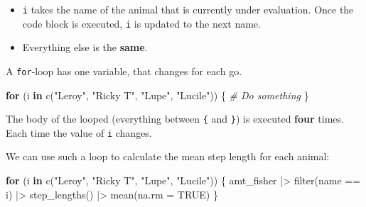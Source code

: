 \documentclass[ignorenonframetext,,t]{beamer}
\let\oldtextbf\textbf
\renewcommand{\textbf}[1]{\textcolor{spamwell}{\oldtextbf{#1}}}
\providecommand{\tightlist}{%
\setlength{\itemsep}{0pt}\setlength{\parskip}{0pt}}
\newenvironment{Shaded}{\begin{snugshade}}{\end{snugshade}}
\newcommand{\AttributeTok}[1]{\textcolor[rgb]{0.77,0.63,0.00}{#1}}
\newcommand{\CommentTok}[1]{\textcolor[rgb]{0.56,0.35,0.01}{\textit{#1}}}
\newcommand{\ConstantTok}[1]{\textcolor[rgb]{0.00,0.00,0.00}{#1}}
\newcommand{\ControlFlowTok}[1]{\textcolor[rgb]{0.13,0.29,0.53}{\textbf{#1}}}
\newcommand{\FunctionTok}[1]{\textcolor[rgb]{0.00,0.00,0.00}{#1}}
\newcommand{\NormalTok}[1]{#1}
\newcommand{\SpecialCharTok}[1]{\textcolor[rgb]{0.00,0.00,0.00}{#1}}
\newcommand{\StringTok}[1]{\textcolor[rgb]{0.31,0.60,0.02}{#1}}
\providecommand{\tightlist}{%
\setlength{\itemsep}{0pt}\setlength{\parskip}{0pt}}
\renewcommand{\tightlist}{\setlength{\itemsep}{1.4ex}\setlength{\parskip}{0pt}}
\begin{document}
\begin{frame}[fragile]
\begin{itemize}
\tightlist
\item
  \texttt{i} takes the name of the animal that is currently under
  evaluation. Once the code block is executed, \texttt{i} is updated to
  the next name.
\item
  Everything else is the \textbf{same}.
\end{itemize}

A \texttt{for}-loop has one variable, that changes for each go.

\begin{Shaded}
\begin{Highlighting}[]
\ControlFlowTok{for}\NormalTok{ (i }\ControlFlowTok{in} \FunctionTok{c}\NormalTok{(}\StringTok{"Leroy"}\NormalTok{, }\StringTok{"Ricky T"}\NormalTok{, }\StringTok{"Lupe"}\NormalTok{, }\StringTok{"Lucile"}\NormalTok{)) \{}
  \CommentTok{\# Do something}
\NormalTok{\}}
\end{Highlighting}
\end{Shaded}

The body of the looped (everything between \texttt{\{} and \texttt{\}})
is executed \textbf{four} times. Each time the value of \texttt{i}
changes.
\end{frame}

\begin{frame}[fragile]
We can use such a loop to calculate the mean step length for each
animal:

\begin{Shaded}
\begin{Highlighting}[]
\ControlFlowTok{for}\NormalTok{ (i }\ControlFlowTok{in} \FunctionTok{c}\NormalTok{(}\StringTok{"Leroy"}\NormalTok{, }\StringTok{"Ricky T"}\NormalTok{, }\StringTok{"Lupe"}\NormalTok{, }\StringTok{"Lucile"}\NormalTok{)) \{}
\NormalTok{  amt\_fisher }\SpecialCharTok{|\textgreater{}} \FunctionTok{filter}\NormalTok{(name }\SpecialCharTok{==}\NormalTok{ i) }\SpecialCharTok{|\textgreater{}} 
    \FunctionTok{step\_lengths}\NormalTok{() }\SpecialCharTok{|\textgreater{}} \FunctionTok{mean}\NormalTok{(}\AttributeTok{na.rm =} \ConstantTok{TRUE}\NormalTok{)}
\NormalTok{\}}
\end{Highlighting}
\end{Shaded}
\end{frame}
\end{document}
